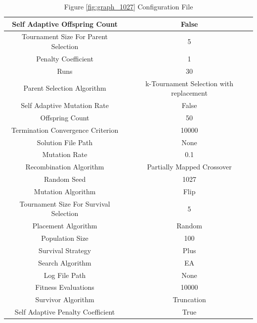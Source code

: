 \documentclass{standalone}
\begin{document}
\begin{table}[!htb]
	\centering
	\caption{Figure \ref{fig:graph_1027} Configuration File}
	\label{tab:graph_1027}
	\begin{tabular}{| c | c |}
		\hline
		Self Adaptive Offspring Count		& False		 \\
		\hline
		Tournament Size For Parent Selection		& 5		 \\
		\hline
		Penalty Coefficient		& 1		 \\
		\hline
		Runs		& 30		 \\
		\hline
		Parent Selection Algorithm		& k-Tournament Selection with replacement		 \\
		\hline
		Self Adaptive Mutation Rate		& False		 \\
		\hline
		Offspring Count		& 50		 \\
		\hline
		Termination Convergence Criterion		& 10000		 \\
		\hline
		Solution File Path		& None		 \\
		\hline
		Mutation Rate		& 0.1		 \\
		\hline
		Recombination Algorithm		& Partially Mapped Crossover		 \\
		\hline
		Random Seed		& 1027		 \\
		\hline
		Mutation Algorithm		& Flip		 \\
		\hline
		Tournament Size For Survival Selection		& 5		 \\
		\hline
		Placement Algorithm		& Random		 \\
		\hline
		Population Size		& 100		 \\
		\hline
		Survival Strategy		& Plus		 \\
		\hline
		Search Algorithm		& EA		 \\
		\hline
		Log File Path		& None		 \\
		\hline
		Fitness Evaluations		& 10000		 \\
		\hline
		Survivor Algorithm		& Truncation		 \\
		\hline
		Self Adaptive Penalty Coefficient		& True		 \\
		\hline
	\end{tabular}
\end{table}
\end{document}
